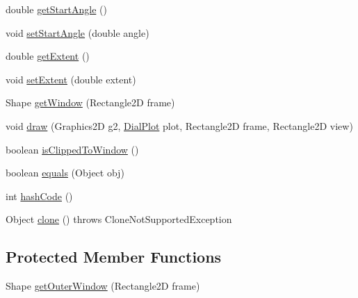 \begin{DoxyCompactItemize}
\item 
double \mbox{\hyperlink{classorg_1_1jfree_1_1chart_1_1plot_1_1dial_1_1_arc_dial_frame_ac58f374c79b5ded1b5c8048d0e5852d8}{get\+Start\+Angle}} ()
\item 
void \mbox{\hyperlink{classorg_1_1jfree_1_1chart_1_1plot_1_1dial_1_1_arc_dial_frame_a0d44deb5dbd1be60ddeca18f1f82b0de}{set\+Start\+Angle}} (double angle)
\item 
double \mbox{\hyperlink{classorg_1_1jfree_1_1chart_1_1plot_1_1dial_1_1_arc_dial_frame_afbdb29587f4c8b558a4eb5401fe333d4}{get\+Extent}} ()
\item 
void \mbox{\hyperlink{classorg_1_1jfree_1_1chart_1_1plot_1_1dial_1_1_arc_dial_frame_a4b7b0351cdc0a449229ba4201f11e0c5}{set\+Extent}} (double extent)
\item 
Shape \mbox{\hyperlink{classorg_1_1jfree_1_1chart_1_1plot_1_1dial_1_1_arc_dial_frame_a60aef0f1dc5859e5d1684d8587c3652d}{get\+Window}} (Rectangle2D frame)
\item 
void \mbox{\hyperlink{classorg_1_1jfree_1_1chart_1_1plot_1_1dial_1_1_arc_dial_frame_a9ae1978aa11aa5274c2503e58e325d3c}{draw}} (Graphics2D g2, \mbox{\hyperlink{classorg_1_1jfree_1_1chart_1_1plot_1_1dial_1_1_dial_plot}{Dial\+Plot}} plot, Rectangle2D frame, Rectangle2D view)
\item 
boolean \mbox{\hyperlink{classorg_1_1jfree_1_1chart_1_1plot_1_1dial_1_1_arc_dial_frame_a6d67ce94c71e357d38bd4c99017418a0}{is\+Clipped\+To\+Window}} ()
\item 
boolean \mbox{\hyperlink{classorg_1_1jfree_1_1chart_1_1plot_1_1dial_1_1_arc_dial_frame_af6ab185aa2d56fec722b605fd13e1626}{equals}} (Object obj)
\item 
int \mbox{\hyperlink{classorg_1_1jfree_1_1chart_1_1plot_1_1dial_1_1_arc_dial_frame_a7f1cf6308962e5c971600334b84282b2}{hash\+Code}} ()
\item 
Object \mbox{\hyperlink{classorg_1_1jfree_1_1chart_1_1plot_1_1dial_1_1_arc_dial_frame_a4b74c7ce7132bf8f984d4a708237df41}{clone}} ()  throws Clone\+Not\+Supported\+Exception 
\end{DoxyCompactItemize}
\subsection*{Protected Member Functions}
\begin{DoxyCompactItemize}
\item 
Shape \mbox{\hyperlink{classorg_1_1jfree_1_1chart_1_1plot_1_1dial_1_1_arc_dial_frame_a7f1e9d19401c6c30e4cc16b22e99fd7e}{get\+Outer\+Window}} (Rectangle2D frame)
\end{DoxyCompactItemize}



